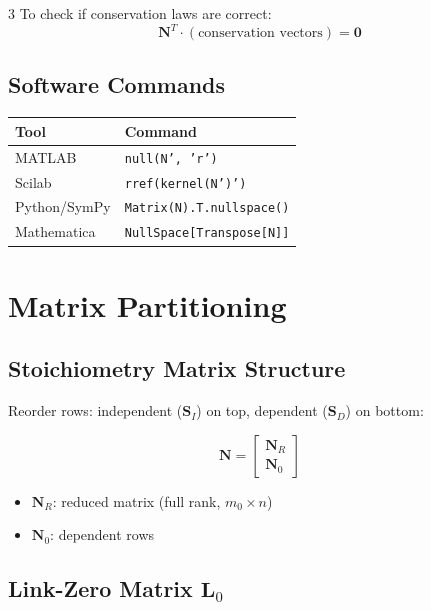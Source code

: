 \documentclass[10pt,landscape,a4paper]{article}
\begin{document}
\begin{multicols}{3}
To check if conservation laws are correct:
\[ \mathbf{N}^T \cdot (\text{conservation vectors}) = \mathbf{0} \]

\subsection{Software Commands}

\begin{center}
\small
\begin{tabular}{@{}ll@{}}
\toprule
\textbf{Tool} & \textbf{Command} \\
\midrule
MATLAB & \texttt{null(N', 'r')} \\
Scilab & \texttt{rref(kernel(N')')} \\
Python/SymPy & \texttt{Matrix(N).T.nullspace()} \\
Mathematica & \texttt{NullSpace[Transpose[N]]} \\
\bottomrule
\end{tabular}
\end{center}

\section{Matrix Partitioning}

\subsection{Stoichiometry Matrix Structure}

Reorder rows: independent ($\mathbf{S}_I$) on top, dependent ($\mathbf{S}_D$) on bottom:

\[
\mathbf{N} = \begin{bmatrix} \mathbf{N}_R \\ \mathbf{N}_0 \end{bmatrix}
\]

\begin{itemize}
\item $\mathbf{N}_R$: reduced matrix (full rank, $m_0 \times n$)
\item $\mathbf{N}_0$: dependent rows
\end{itemize}

\subsection{Link-Zero Matrix $\mathbf{L}_0$}


\end{multicols}
\end{document}
